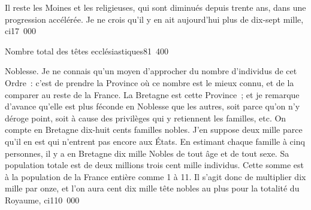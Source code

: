 \documentclass[french,twoside]{book} %
\begin{document}
Il reste les Moines et les religieuses, qui sont diminués depuis trente ans, dans une progression accélérée. Je ne crois qu’il y en ait aujourd’hui plus de dix-sept mille, ci\hspace{1em}\hspace{1em}\hspace{1em}\hspace{1em}17 000\par
Nombre total des têtes ecclésiastiques\hspace{1em}\hspace{1em}\hspace{1em}81 400\par
\par
Noblesse. Je ne connais qu’un moyen d’approcher du nombre d’individus de cet Ordre : c’est de prendre la Province où ce nombre est le mieux connu, et de la comparer au reste de la France. La Bretagne est cette Province ; et je remarque d’avance qu’elle est plus féconde en Noblesse que les autres, soit parce qu’on n’y déroge point, soit à cause des privilèges qui y retiennent les familles, etc. On compte en Bretagne dix-huit cents familles nobles. J’en suppose deux mille parce qu’il en est qui n’entrent pas encore aux États. En estimant chaque famille à cinq personnes, il y a en Bretagne dix mille Nobles de tout âge et de tout sexe. Sa population totale est de deux millions trois cent mille individus. Cette somme est à la population de la France entière comme 1 à 11. Il s’agit donc de multiplier dix mille par onze, et l’on aura cent dix mille tête nobles au plus pour la totalité du Royaume, ci\hspace{1em}110 000\par
\end{document}
